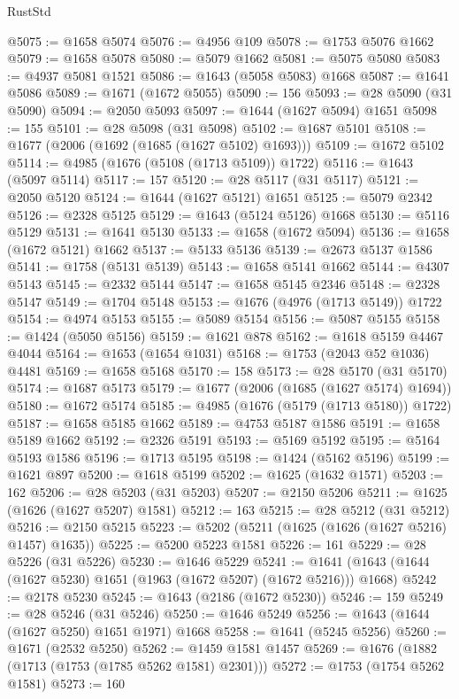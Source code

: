 \begin{lexlean}{RustStd}
\begin{coremodule}
@5075 := @1658 @5074
@5076 := @4956 @109
@5078 := @1753 @5076 @1662
@5079 := @1658 @5078
@5080 := @5079 @1662
@5081 := @5075 @5080
@5083 := @4937 @5081 @1521
@5086 := @1643 (@5058 @5083) @1668
@5087 := @1641 @5086
@5089 := @1671 (@1672 @5055)
@5090 := 156
@5093 := @28 @5090 (@31 @5090)
@5094 := @2050 @5093
@5097 := @1644 (@1627 @5094) @1651
@5098 := 155
@5101 := @28 @5098 (@31 @5098)
@5102 := @1687 @5101
@5108 := @1677 (@2006 (@1692 (@1685 (@1627 @5102) @1693)))
@5109 := @1672 @5102
@5114 := @4985 (@1676 (@5108 (@1713 @5109)) @1722)
@5116 := @1643 (@5097 @5114)
@5117 := 157
@5120 := @28 @5117 (@31 @5117)
@5121 := @2050 @5120
@5124 := @1644 (@1627 @5121) @1651
@5125 := @5079 @2342
@5126 := @2328 @5125
@5129 := @1643 (@5124 @5126) @1668
@5130 := @5116 @5129
@5131 := @1641 @5130
@5133 := @1658 (@1672 @5094)
@5136 := @1658 (@1672 @5121) @1662
@5137 := @5133 @5136
@5139 := @2673 @5137 @1586
@5141 := @1758 (@5131 @5139)
@5143 := @1658 @5141 @1662
@5144 := @4307 @5143
@5145 := @2332 @5144
@5147 := @1658 @5145 @2346
@5148 := @2328 @5147
@5149 := @1704 @5148
@5153 := @1676 (@4976 (@1713 @5149)) @1722
@5154 := @4974 @5153
@5155 := @5089 @5154
@5156 := @5087 @5155
@5158 := @1424 (@5050 @5156)
@5159 := @1621 @878
@5162 := @1618 @5159 @4467 @4044
@5164 := @1653 (@1654 @1031)
@5168 := @1753 (@2043 @52 @1036) @4481
@5169 := @1658 @5168
@5170 := 158
@5173 := @28 @5170 (@31 @5170)
@5174 := @1687 @5173
@5179 := @1677 (@2006 (@1685 (@1627 @5174) @1694))
@5180 := @1672 @5174
@5185 := @4985 (@1676 (@5179 (@1713 @5180)) @1722)
@5187 := @1658 @5185 @1662
@5189 := @4753 @5187 @1586
@5191 := @1658 @5189 @1662
@5192 := @2326 @5191
@5193 := @5169 @5192
@5195 := @5164 @5193 @1586
@5196 := @1713 @5195
@5198 := @1424 (@5162 @5196)
@5199 := @1621 @897
@5200 := @1618 @5199
@5202 := @1625 (@1632 @1571)
@5203 := 162
@5206 := @28 @5203 (@31 @5203)
@5207 := @2150 @5206
@5211 := @1625 (@1626 (@1627 @5207) @1581)
@5212 := 163
@5215 := @28 @5212 (@31 @5212)
@5216 := @2150 @5215
@5223 := @5202 (@5211 (@1625 (@1626 (@1627 @5216) @1457) @1635))
@5225 := @5200 @5223 @1581
@5226 := 161
@5229 := @28 @5226 (@31 @5226)
@5230 := @1646 @5229
@5241 := @1641 (@1643 (@1644 (@1627 @5230) @1651 (@1963 (@1672 @5207) (@1672 @5216))) @1668)
@5242 := @2178 @5230
@5245 := @1643 (@2186 (@1672 @5230))
@5246 := 159
@5249 := @28 @5246 (@31 @5246)
@5250 := @1646 @5249
@5256 := @1643 (@1644 (@1627 @5250) @1651 @1971) @1668
@5258 := @1641 (@5245 @5256)
@5260 := @1671 (@2532 @5250)
@5262 := @1459 @1581 @1457
@5269 := @1676 (@1882 (@1713 (@1753 (@1785 @5262 @1581) @2301)))
@5272 := @1753 (@1754 @5262 @1581)
@5273 := 160

\end{coremodule}
\end{lexlean}

